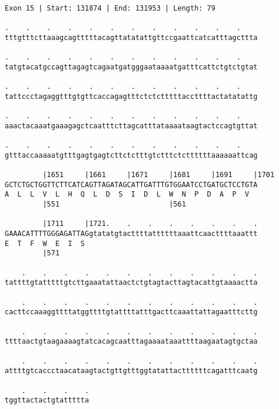 \documentclass{article}
\begin{document}
\begin{Verbatim}
Exon 15 | Start: 131874 | End: 131953 | Length: 79
 
.    .    .    .    .    .    .    .    .    .    .    .    
tttgtttcttaaagcagtttttacagttatatattgttccgaattcatcatttagcttta
  
.    .    .    .    .    .    .    .    .    .    .    .    
tatgtacatgccagttagagtcagaatgatgggaataaaatgatttcattctgtctgtat
  
.    .    .    .    .    .    .    .    .    .    .    .    
tattccctagaggtttgtgttcaccagagtttctctctttttaccttttactatatattg
  
.    .    .    .    .    .    .    .    .    .    .    .    
aaactacaaatgaaagagctcaatttcttagcatttataaaataagtactccagtgttat
  
.    .    .    .    .    .    .    .    .    .    .    .    
gtttaccaaaaatgtttgagtgagtcttctctttgtctttctcttttttaaaaaattcag
  
         |1651     |1661     |1671     |1681     |1691     |1701
GCTCTGCTGGTTCTTCATCAGTTAGATAGCATTGATTTGTGGAATCCTGATGCTCCTGTA
A  L  L  V  L  H  Q  L  D  S  I  D  L  W  N  P  D  A  P  V  
         |551                          |561                 
  
         |1711     |1721.    .    .    .    .    .    .    .
GAAACATTTTGGGAGATTAGgtatatgtacttttattttttaaattcaacttttaaattt
E  T  F  W  E  I  S                                         
         |571                                               
  
    .    .    .    .    .    .    .    .    .    .    .    .
tattttgtatttttgtcttgaaatattaactctgtagtacttagtacattgtaaaactta
  
    .    .    .    .    .    .    .    .    .    .    .    .
cacttccaaaggttttatggttttgtattttatttgacttcaaattattagaatttcttg
  
    .    .    .    .    .    .    .    .    .    .    .    .
ttttaactgtaagaaaagtatcacagcaatttagaaaataaattttaagaatagtgctaa
  
    .    .    .    .    .    .    .    .    .    .    .    .
attttgtcaccctaacataagtactgttgtttggtatattacttttttcagatttcaatg
  
    .    .    .    .
tggttactactgtattttta
\end{Verbatim}
\newpage
\end{document}
